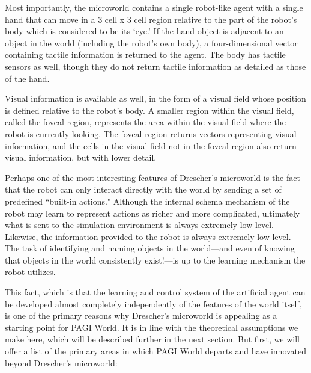 Most importantly, the microworld contains a single robot-like agent with a single hand that can move in a 3 cell x 3 cell region relative to the part of the robot's body which is considered to be its `eye.' If the hand object is adjacent to an object in the world (including the robot's own body), a four-dimensional vector containing tactile information is returned to the agent. The body has tactile sensors as well, though they do not return tactile information as detailed as those of the hand. 

Visual information is available as well, in the form of a visual field whose position is defined relative to the robot's body. A smaller region within the visual field, called the foveal region, represents the area within the visual field where the robot is currently looking. The foveal region returns vectors representing visual information, and the cells in the visual field not in the foveal region also return visual information, but with lower detail. 

Perhaps one of the most interesting features of Drescher's microworld is the fact that the robot can only interact directly with the world by sending a set of predefined ``built-in actions." Although the internal schema mechanism of the robot may learn to represent actions as richer and more complicated, ultimately what is sent to the simulation environment is always extremely low-level. Likewise, the information provided to the robot is always extremely low-level. The task of identifying and naming objects in the world---and even of knowing that objects in the world consistently exist!---is up to the learning mechanism the robot utilizes.

This fact, which is that the learning and control system of the artificial agent can be developed almost completely independently of the features of the world itself, is one of the primary reasons why Drescher's microworld is appealing as a starting point for PAGI World. It is in line with the theoretical assumptions we make here, which will be described further in the next section. But first, we will offer a list of the primary areas in which PAGI World departs and have innovated beyond Drescher's microworld:


